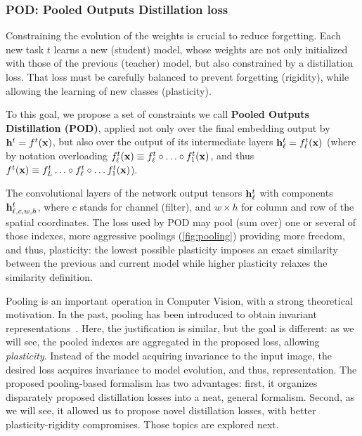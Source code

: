 \subsubsection{POD: Pooled Outputs Distillation loss}
\label{sec:pod}

Constraining the evolution of the weights is crucial to reduce forgetting. Each new task $t$ learns
a new (student) model, whose weights are not only initialized with those of the previous (teacher)
model, but also constrained by a distillation loss. That loss must be carefully balanced to prevent
forgetting (rigidity), while allowing the learning of new classes (plasticity).

To this goal, we propose a set of constraints we call \textbf{Pooled Outputs Distillation (POD)},
applied not only over the final embedding output by $\mathbf{h}^{t}=f^{t}(\mathbf{x})$, but also over the output
of its intermediate layers $\mathbf{h}^{t}_\ell=f^{t}_\ell(\mathbf{x})$ (where by notation overloading
$f^{t}_\ell(\mathbf{x})\equiv f^{t}_\ell\circ\ldots\circ f^{t}_1(\mathbf{x})$, and thus $f^{t}(\mathbf{x})\equiv
    f^{t}_L\ldots\circ f^{t}_\ell\circ\ldots f^{t}_1(\mathbf{x})$).

The convolutional layers of the network output tensors $\mathbf{h}^{t}_{\ell}$ with components
$\mathbf{h}^{t}_{\ell,c,w,h}$, where $c$ stands for channel (filter), and $w\times h$ for column and row of
the spatial coordinates. The loss used by POD may pool (sum over) one or several of those indexes,
more aggressive poolings (\autoref{fig:pooling}) providing more freedom, and thus, plasticity: the
lowest possible plasticity imposes an exact similarity between the previous and current model while
higher plasticity relaxes the similarity definition.

Pooling is an important operation in Computer Vision, with a strong theoretical motivation. In the
past, pooling has been introduced to obtain invariant
representations~\citep{lowe1999sift,lazbnik2006spatial_pyramid_matching}. Here, the justification is
similar, but the goal is different: as we will see, the pooled indexes are aggregated in the
proposed loss, allowing \textit{plasticity}. Instead of the model acquiring invariance to the input
image, the desired loss acquires invariance to model evolution, and thus, representation.
%
The proposed pooling-based formalism has two advantages: first, it organizes disparately proposed
distillation losses into a neat, general formalism. Second, as we will see, it allowed us to propose
novel distillation losses, with better plasticity-rigidity compromises. Those topics are explored
next.

